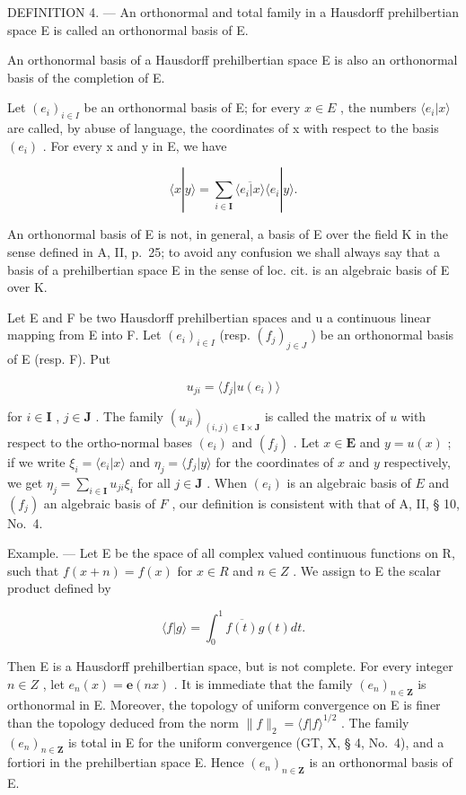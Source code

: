 DEFINITION 4. --- An orthonormal and total family in a Hausdorff prehilbertian space E is called an orthonormal basis of E.

An orthonormal basis of a Hausdorff prehilbertian space E is also an orthonormal basis of the completion of E.

Let \((e_{i})_{i\in I}\) be an orthonormal basis of E; for every \(x\in E\) , the numbers \(\langle e_{i}|x\rangle\) are called, by abuse of language, the coordinates of x with respect to the basis \((e_{i})\) . For every x and y in E, we have

\[
\langle x | y \rangle = \sum_ {i \in \mathbf {I}} \overline {{\langle e _ {i} | x \rangle}} \langle e _ {i} | y \rangle .\tag{3}
\]

An orthonormal basis of E is not, in general, a basis of E over the field K in the sense defined in A, II, p.~25; to avoid any confusion we shall always say that a basis of a prehilbertian space E in the sense of loc. cit. is an algebraic basis of E over K.

Let E and F be two Hausdorff prehilbertian spaces and u a continuous linear mapping from E into F. Let \((e_{i})_{i\in I}\) (resp. \((f_{j})_{j\in J}\) ) be an orthonormal basis of E (resp. F). Put

\[
u _ {j i} = \langle f _ {j} | u (e _ {i}) \rangle
\]

for \(i \in \mathbf{I}\) , \(j \in \mathbf{J}\) . The family \((u_{ji})_{(i,j) \in \mathbf{I} \times \mathbf{J}}\) is called the matrix of \(u\) with respect to the ortho-normal bases \((e_i)\) and \((f_j)\) . Let \(x \in \mathbf{E}\) and \(y = u(x)\) ; if we write \(\xi_i = \langle e_i | x \rangle\) and \(\eta_j = \langle f_j | y \rangle\) for the coordinates of \(x\) and \(y\) respectively, we get \(\eta_j = \sum_{i \in \mathbf{I}} u_{ji} \xi_i\) for all \(j \in \mathbf{J}\) . When \((e_i)\) is an algebraic basis of \(E\) and \((f_j)\) an algebraic basis of \(F\) , our definition is consistent with that of A, II, § 10, No.~4.

Example. --- Let E be the space of all complex valued continuous functions on R, such that \(f(x + n) = f(x)\) for \(x \in R\) and \(n \in Z\) . We assign to E the scalar product defined by

\[
\langle f | g \rangle = \int_ {0} ^ {1} \overline {{{{f (t)}}}} g (t) d t.
\]

Then E is a Hausdorff prehilbertian space, but is not complete. For every integer \(n \in Z\) , let \(e_{n}(x) = \mathbf{e}(nx)\) . It is immediate that the family \((e_{n})_{n \in \mathbf{Z}}\) is orthonormal in E. Moreover, the topology of uniform convergence on E is finer than the topology deduced from the norm \(\|f\|_{2} = \langle f | f \rangle^{1/2}\) . The family \((e_{n})_{n \in \mathbf{Z}}\) is total in E for the uniform convergence (GT, X, § 4, No.~4), and a fortiori in the prehilbertian space E. Hence \((e_{n})_{n \in \mathbf{Z}}\) is an orthonormal basis of E.

